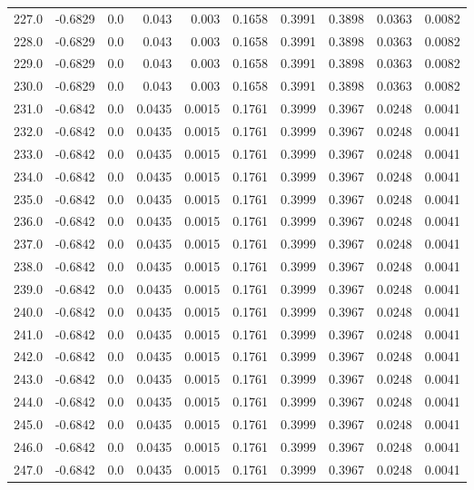 \begin{longtable}{lrrrrrrrrr}
227.0 & -0.6829 & 0.0 & 0.043 & 0.003 & 0.1658 & 0.3991 & 0.3898 & 0.0363 & 0.0082 \\
228.0 & -0.6829 & 0.0 & 0.043 & 0.003 & 0.1658 & 0.3991 & 0.3898 & 0.0363 & 0.0082 \\
229.0 & -0.6829 & 0.0 & 0.043 & 0.003 & 0.1658 & 0.3991 & 0.3898 & 0.0363 & 0.0082 \\
230.0 & -0.6829 & 0.0 & 0.043 & 0.003 & 0.1658 & 0.3991 & 0.3898 & 0.0363 & 0.0082 \\
231.0 & -0.6842 & 0.0 & 0.0435 & 0.0015 & 0.1761 & 0.3999 & 0.3967 & 0.0248 & 0.0041 \\
232.0 & -0.6842 & 0.0 & 0.0435 & 0.0015 & 0.1761 & 0.3999 & 0.3967 & 0.0248 & 0.0041 \\
233.0 & -0.6842 & 0.0 & 0.0435 & 0.0015 & 0.1761 & 0.3999 & 0.3967 & 0.0248 & 0.0041 \\
234.0 & -0.6842 & 0.0 & 0.0435 & 0.0015 & 0.1761 & 0.3999 & 0.3967 & 0.0248 & 0.0041 \\
235.0 & -0.6842 & 0.0 & 0.0435 & 0.0015 & 0.1761 & 0.3999 & 0.3967 & 0.0248 & 0.0041 \\
236.0 & -0.6842 & 0.0 & 0.0435 & 0.0015 & 0.1761 & 0.3999 & 0.3967 & 0.0248 & 0.0041 \\
237.0 & -0.6842 & 0.0 & 0.0435 & 0.0015 & 0.1761 & 0.3999 & 0.3967 & 0.0248 & 0.0041 \\
238.0 & -0.6842 & 0.0 & 0.0435 & 0.0015 & 0.1761 & 0.3999 & 0.3967 & 0.0248 & 0.0041 \\
239.0 & -0.6842 & 0.0 & 0.0435 & 0.0015 & 0.1761 & 0.3999 & 0.3967 & 0.0248 & 0.0041 \\
240.0 & -0.6842 & 0.0 & 0.0435 & 0.0015 & 0.1761 & 0.3999 & 0.3967 & 0.0248 & 0.0041 \\
241.0 & -0.6842 & 0.0 & 0.0435 & 0.0015 & 0.1761 & 0.3999 & 0.3967 & 0.0248 & 0.0041 \\
242.0 & -0.6842 & 0.0 & 0.0435 & 0.0015 & 0.1761 & 0.3999 & 0.3967 & 0.0248 & 0.0041 \\
243.0 & -0.6842 & 0.0 & 0.0435 & 0.0015 & 0.1761 & 0.3999 & 0.3967 & 0.0248 & 0.0041 \\
244.0 & -0.6842 & 0.0 & 0.0435 & 0.0015 & 0.1761 & 0.3999 & 0.3967 & 0.0248 & 0.0041 \\
245.0 & -0.6842 & 0.0 & 0.0435 & 0.0015 & 0.1761 & 0.3999 & 0.3967 & 0.0248 & 0.0041 \\
246.0 & -0.6842 & 0.0 & 0.0435 & 0.0015 & 0.1761 & 0.3999 & 0.3967 & 0.0248 & 0.0041 \\
247.0 & -0.6842 & 0.0 & 0.0435 & 0.0015 & 0.1761 & 0.3999 & 0.3967 & 0.0248 & 0.0041 \\

\end{longtable}
